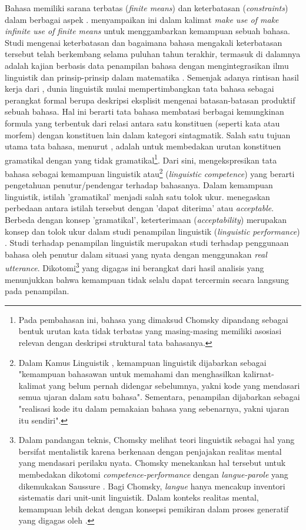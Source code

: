 Bahasa memiliki sarana terbatas (\textit{finite means}) dan keterbatasan (\textit{constraints}) dalam berbagai aspek \citep{von1972origin}. \cite{von1972origin} menyampaikan ini dalam kalimat \textit{make use of make infinite use of finite means} untuk menggambarkan kemampuan sebuah bahasa. Studi mengenai keterbatasan dan bagaimana bahasa mengakali keterbatasan tersebut telah berkembang selama puluhan tahun terakhir, termasuk di dalamnya adalah kajian berbasis data penampilan bahasa dengan mengintegrasikan ilmu linguistik dan prinsip-prinsip dalam matematika \citep{chomsky1965syntactic}. Semenjak adanya rintisan hasil kerja dari \cite{chomsky1957syntactic}, dunia linguistik mulai mempertimbangkan tata bahasa sebagai perangkat formal berupa deskripsi eksplisit mengenai batasan-batasan produktif sebuah bahasa. Hal ini berarti tata bahasa membatasi berbagai kemungkinan formula yang terbentuk dari relasi antara satu konstituen (seperti kata atau morfem) dengan konstituen lain dalam kategori sintagmatik. Salah satu tujuan utama tata bahasa, menurut \cite{chomsky1965syntactic}, adalah untuk membedakan urutan konstituen gramatikal dengan yang tidak gramatikal\footnote{Pada pembahasan ini, bahasa yang dimaksud Chomsky dipandang sebagai bentuk urutan kata tidak terbatas yang masing-masing memiliki asosiasi relevan dengan deskripsi struktural tata bahasanya.}. Dari sini, \cite{chomsky1965syntactic} mengekspresikan tata bahasa sebagai kemampuan linguistik atau\footnote{Dalam Kamus Linguistik \citep{kridalaksana2008kamus}, kemampuan linguistik dijabarkan sebagai "kemampuan bahasawan untuk memahami dan menghasilkan kalirnat-kalimat yang belum pernah didengar sebelumnya, yakni kode yang mendasari semua ujaran dalam satu bahasa". Sementara, penampilan dijabarkan sebagai "realisasi kode itu dalam pemakaian bahasa yang sebenarnya, yakni ujaran itu sendiri".} (\textit{linguistic competence}) yang berarti pengetahuan penutur/pendengar terhadap bahasanya. Dalam kemampuan linguistik, istilah 'gramatikal' menjadi salah satu tolok ukur. \cite{chomsky1965syntactic} menegaskan perbedaan antara istilah tersebut dengan 'dapat diterima' atau \textit{acceptable}.  Berbeda dengan konsep 'gramatikal', keterterimaan (\textit{acceptability}) merupakan konsep dan tolok ukur dalam studi penampilan linguistik (\textit{linguistic performance}) \citep{chomsky1965syntactic}. Studi terhadap penampilan linguistik merupakan studi terhadap penggunaan bahasa oleh penutur dalam situasi yang nyata dengan menggunakan \textit{real utterance}. Dikotomi\footnote{Dalam pandangan teknis, Chomsky melihat teori linguistik sebagai hal yang bersifat mentalistik karena berkenaan dengan penjajakan realitas mental yang mendasari perilaku nyata. Chomsky menekankan hal tersebut untuk membedakan dikotomi \textit{competence-performance} dengan \textit{langue-parole} yang dikemukakan Saussure \citep{key2017course}. Bagi Chomsky, \textit{langue} hanya mencakup inventori sistematis dari unit-unit linguistik. Dalam konteks realitas mental, kemampuan lebih dekat dengan konsepsi pemikiran dalam proses generatif yang digagas oleh \cite{von1972origin}.} yang digagas  \cite{chomsky1965syntactic} ini berangkat dari hasil analisis yang menunjukkan bahwa kemampuan tidak selalu dapat tercermin secara langsung pada penampilan.

